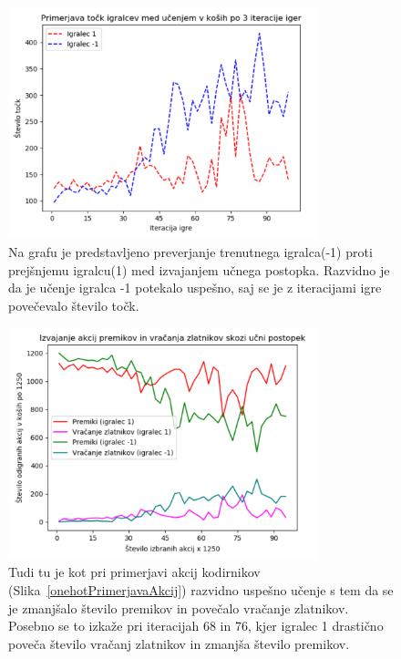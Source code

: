 \documentclass[a4paper, 12pt]{book}
\begin{document}
{\begin{figure}[h!]
	\begin{center}
		\includegraphics[width=0.8\textwidth]{photos/learn_plot.pdf}
	\end{center}
	\caption{Na grafu je predstavljeno preverjanje trenutnega igralca(-1) proti prejšnjemu igralcu(1) med izvajanjem učnega postopka.
		Razvidno je da je učenje igralca -1 potekalo uspešno, saj se je z iteracijami igre povečevalo število točk.}
	\label{learn_plot}
\end{figure}

\begin{figure}[h!]
	\begin{center}
		\includegraphics[width=0.8\textwidth]{photos/return_move_learn.pdf}
	\end{center}
	\caption{Tudi tu je kot pri primerjavi akcij kodirnikov (Slika~\ref{onehotPrimerjavaAkcij}) razvidno uspešno učenje s tem da se je zmanjšalo število premikov in povečalo vračanje zlatnikov.
		Posebno se to izkaže pri iteracijah 68 in 76, kjer igralec 1 drastično poveča število vračanj zlatnikov in zmanjša število premikov.}
	\label{return_move_learn}
\end{figure}

}
\end{document}
